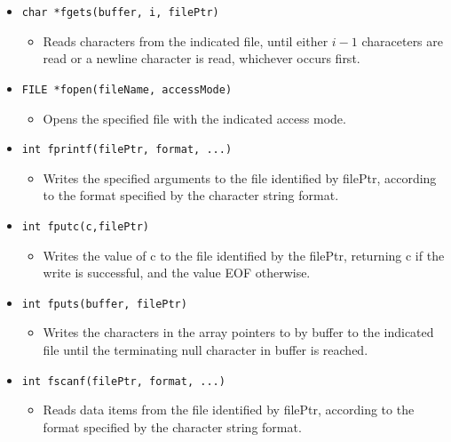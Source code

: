 \begin{itemize}
    \item \texttt{char *fgets(buffer, i, filePtr)}
        \begin{itemize}
            \item Reads characters from the indicated file, until either $i-1$ characeters are read or a newline character is read, whichever occurs first.
        \end{itemize}
    
    \item \texttt{FILE *fopen(fileName, accessMode)}
        \begin{itemize}
            \item Opens the specified file with the indicated access mode.
        \end{itemize}
    
    \item \texttt{int fprintf(filePtr, format, ...)}
        \begin{itemize}
            \item Writes the specified arguments to the file identified by filePtr, according to the format specified by the character string format. 
        \end{itemize}
    
    \item \texttt{int fputc(c,filePtr)}
        \begin{itemize}
            \item Writes the value of c to the file identified by the filePtr, returning c if the write is successful, and the value EOF otherwise.
        \end{itemize}
    
    \item \texttt{int fputs(buffer, filePtr)}
        \begin{itemize}
            \item Writes the characters in the array pointers to by buffer to the indicated file until the terminating null character in buffer is reached.
        \end{itemize}
    
    \item \texttt{int fscanf(filePtr, format, ...)}
        \begin{itemize}
            \item Reads data items from the file identified by filePtr, according to the format specified by the character string format. 
        \end{itemize}
    

\end{itemize}
